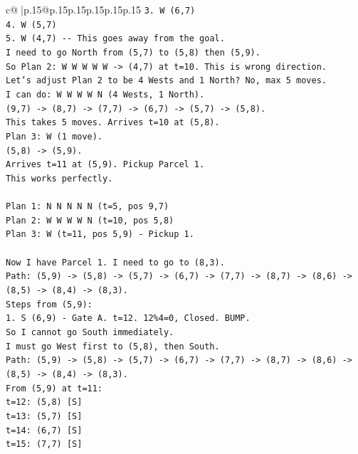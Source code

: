 \documentclass{article}
\begin{document}
{\begin{supertabular}{c@{$\;$}|p{.15\linewidth}@{}p{.15\linewidth}p{.15\linewidth}p{.15\linewidth}p{.15\linewidth}p{.15\linewidth}}
{{{\texttt{3. W (6,7)} \\
\texttt{4. W (5,7)} \\
\texttt{5. W (4,7) {-}{-} This goes away from the goal.} \\
\texttt{I need to go North from (5,7) to (5,8) then (5,9).} \\
\texttt{So Plan 2: W W W W W {-}> (4,7) at t=10. This is wrong direction.} \\
\texttt{Let's adjust Plan 2 to be 4 Wests and 1 North? No, max 5 moves.} \\
\texttt{I can do: W W W W N (4 Wests, 1 North).} \\
\texttt{(9,7) {-}> (8,7) {-}> (7,7) {-}> (6,7) {-}> (5,7) {-}> (5,8).} \\
\texttt{This takes 5 moves. Arrives t=10 at (5,8).} \\
\texttt{Plan 3: W (1 move).} \\
\texttt{(5,8) {-}> (5,9).} \\
\texttt{Arrives t=11 at (5,9). Pickup Parcel 1.} \\
\texttt{This works perfectly.} \\
\\ 
\texttt{Plan 1: N N N N N (t=5, pos 9,7)} \\
\texttt{Plan 2: W W W W N (t=10, pos 5,8)} \\
\texttt{Plan 3: W (t=11, pos 5,9) {-} Pickup 1.} \\
\\ 
\texttt{Now I have Parcel 1. I need to go to (8,3).} \\
\texttt{Path: (5,9) {-}> (5,8) {-}> (5,7) {-}> (6,7) {-}> (7,7) {-}> (8,7) {-}> (8,6) {-}> (8,5) {-}> (8,4) {-}> (8,3).} \\
\texttt{Steps from (5,9):} \\
\texttt{1. S (6,9) {-} Gate A. t=12. 12\%4=0, Closed. BUMP.} \\
\texttt{So I cannot go South immediately.} \\
\texttt{I must go West first to (5,8), then South.} \\
\texttt{Path: (5,9) {-}> (5,8) {-}> (5,7) {-}> (6,7) {-}> (7,7) {-}> (8,7) {-}> (8,6) {-}> (8,5) {-}> (8,4) {-}> (8,3).} \\
\texttt{From (5,9) at t=11:} \\
\texttt{t=12: (5,8) {[}S{]}} \\
\texttt{t=13: (5,7) {[}S{]}} \\
\texttt{t=14: (6,7) {[}S{]}} \\
\texttt{t=15: (7,7) {[}S{]}} \\
}}}
\end{supertabular}}
\end{document}
